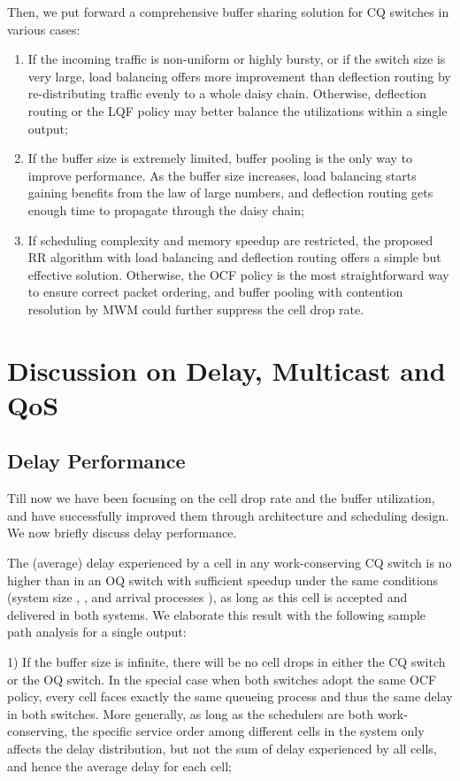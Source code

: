\documentclass[journal,final,doublecolumn,10pt,twoside]{IEEEtranTCOM} \normalsize
\begin{document}
Then, we put forward a comprehensive buffer sharing solution for CQ switches in various cases:
\begin{enumerate}
\item If the incoming traffic is non-uniform or highly bursty, or if the switch size is very large, load balancing offers more improvement than deflection routing by re-distributing traffic evenly to a whole daisy chain. Otherwise, deflection routing or the LQF policy may better balance the utilizations within a single output;
\item If the buffer size is extremely limited, buffer pooling is the only way to improve performance. As the buffer size increases, load balancing starts gaining benefits from the law of large numbers, and deflection routing gets enough time to propagate through the daisy chain;
\item If scheduling complexity and memory speedup are restricted, the proposed RR algorithm with load balancing and deflection routing offers a simple but effective solution. Otherwise, the OCF policy is the most straightforward way to ensure correct packet ordering, and buffer pooling with contention resolution by MWM could further suppress the cell drop rate.
\end{enumerate}

\section{Discussion on Delay, Multicast and QoS}
\label{sec:discussion}

\subsection {Delay Performance}

Till now we have been focusing on the cell drop rate and the buffer utilization, and have successfully improved them through architecture and scheduling design. We now briefly discuss delay performance.

The (average) delay experienced by a cell in any work-conserving CQ switch is no higher than in an OQ switch with sufficient speedup under the same conditions (system size , , and arrival processes ), as long as this cell is accepted and delivered in both systems. We elaborate this result with the following sample path analysis for a single output:

1) If the buffer size is infinite, there will be no cell drops in either the CQ switch or the OQ switch. In the special case when both switches adopt the same OCF policy, every cell faces exactly the same queueing process and thus the same delay in both switches. More generally, as long as the schedulers are both work-conserving, the specific service order among different cells in the system only affects the delay distribution, but not the sum of delay experienced by all cells, and hence the average delay for each cell;
\end{document}
